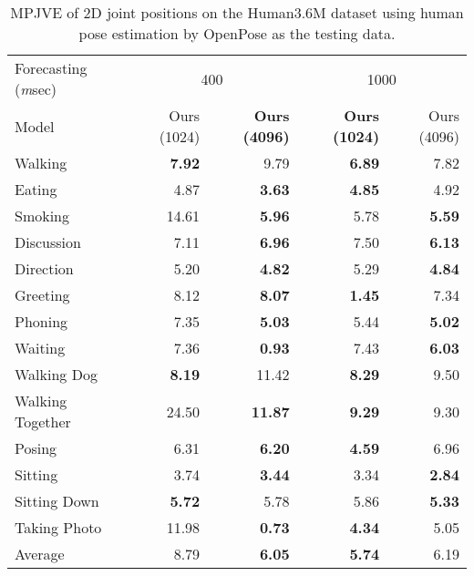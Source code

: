 \begin{table}
    \centering
    \caption{
        MPJVE of 2D joint positions on the Human3.6M dataset using human pose estimation by OpenPose as the testing data.
    }
    \begin{tabular}{l|rr|rr}
    \toprule
        Forecasting ({\textit msec})  & \multicolumn{2}{c|}{400}                        & \multicolumn{2}{c}{1000} \\
         Model    & Ours (1024)  &  \textbf{Ours (4096)} & \textbf{Ours (1024)}  &  Ours (4096)\\

        \midrule
        Walking & \textbf{7.92} & 9.79 & \textbf{6.89} & 7.82\\
        Eating & 4.87 & \textbf{3.63} & \textbf{4.85} & 4.92\\
        Smoking & 14.61 & \textbf{5.96} & 5.78 & \textbf{5.59}\\
        Discussion & 7.11 & \textbf{6.96} & 7.50 & \textbf{6.13}\\
        Direction & 5.20 & \textbf{4.82} & 5.29 & \textbf{4.84}\\
        Greeting & 8.12 & \textbf{8.07} & \textbf{1.45} & 7.34\\
        Phoning & 7.35 & \textbf{5.03} & 5.44 & \textbf{5.02}\\
        Waiting & 7.36 & \textbf{0.93} & 7.43 & \textbf{6.03}\\
        Walking Dog & \textbf{8.19} & 11.42 & \textbf{8.29} & 9.50\\
        Walking Together & 24.50 & \textbf{11.87} & \textbf{9.29} & 9.30\\
        Posing & 6.31 & \textbf{6.20} & \textbf{4.59} & 6.96\\
        Sitting & 3.74 & \textbf{3.44} & 3.34 & \textbf{2.84}\\
        Sitting Down & \textbf{5.72} & 5.78 & 5.86 & \textbf{5.33}\\
        Taking Photo & 11.98 & \textbf{0.73} & \textbf{4.34} & 5.05\\
        \midrule
        Average  & 8.79 & \textbf{6.05} & \textbf{5.74} & 6.19\\
        \bottomrule
    \end{tabular}
    \label{tbl:MPJVE_openpose}
\end{table}

